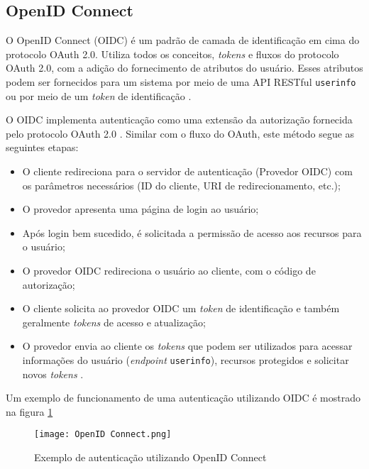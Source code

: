 \subsection{OpenID Connect}

O OpenID Connect (OIDC) é um padrão de camada de identificação em cima do protocolo OAuth 2.0. Utiliza 
todos os conceitos, \emph{tokens} e fluxos do protocolo OAuth 2.0, com a adição do fornecimento de 
atributos do usuário. Esses atributos podem ser 
fornecidos para um sistema por meio de uma API RESTful \texttt{userinfo} ou por meio de um 
\emph{token} de identificação \cite{BIEHL2019}.

O OIDC implementa autenticação como uma extensão da autorização fornecida pelo protocolo OAuth 2.0 
\cite{OIDCCORE}. Similar com o fluxo do OAuth, este método segue as seguintes etapas:

\begin{itemize}
    \item O cliente redireciona para o servidor de autenticação (Provedor OIDC) com os parâmetros 
    necessários (ID do cliente, URI de redirecionamento, etc.);
    \item O provedor apresenta uma página de login ao usuário;
    \item Após login bem sucedido, é solicitada a permissão de acesso aos recursos para o usuário;
    \item O provedor OIDC redireciona o usuário ao cliente, com o código de autorização;
    \item O cliente solicita ao provedor OIDC um \emph{token} de identificação e também geralmente
\emph{tokens} de acesso e atualização;
    \item O provedor envia ao cliente os \emph{tokens} que podem ser utilizados para acessar 
informações do usuário (\emph{endpoint} \texttt{userinfo}), recursos protegidos e solicitar novos 
\emph{tokens} \cite{OIDCCORE}.
\end{itemize}

Um exemplo de funcionamento de uma autenticação utilizando OIDC é mostrado na figura 
\ref{fig:OpenID}

\begin{figure}[ht]
    \centering
    \texttt{[image: OpenID Connect.png]}
    \caption{Exemplo de autenticação utilizando OpenID Connect}
    \label{fig:OpenID}
\end{figure}